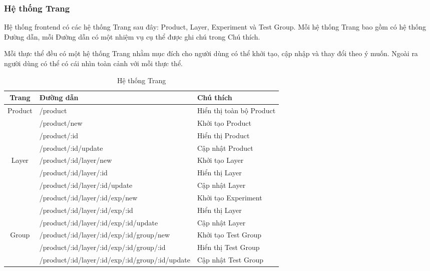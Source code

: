 \subsubsection{Hệ thống Trang}

Hệ thống frontend có các hệ thống Trang sau đây: Product, Layer, Experiment và Test Group. Mỗi hệ thống Trang bao gồm có hệ thống Đường dẫn, mỗi Đường dẫn có một nhiệm vụ cụ thể được ghi chú trong Chú thích.

Mỗi thực thể đều có một hệ thống Trang nhằm mục đích cho người dùng có thể khởi tạo, cập nhập và thay đổi theo ý muốn. Ngoài ra người dùng có thể có cái nhìn toàn cảnh với mỗi thực thể.

\begin{table}[H]
	\centering
	\begin{tabular}{|c|l|p{5cm}|}
		\hline
		Trang                    & Đường dẫn                                       & Chú thích                \\ \hline
		\multirow{4}{*}{Product} & /product                                        & Hiển thị toàn bộ Product \\ \cline{2-3}
		                         & /product/new                                    & Khởi tạo Product         \\ \cline{2-3}
		                         & /product/:id                                    & Hiển thị Product         \\ \cline{2-3}
		                         & /product/:id/update                             & Cập nhật Product         \\ \hline
		\multirow{4}{*}{Layer}
		                         & /product/:id/layer/new                          & Khởi tạo Layer           \\ \cline{2-3}
		                         & /product/:id/layer/:id                          & Hiển thị Layer           \\ \cline{2-3}
		                         & /product/:id/layer/:id/update                   & Cập nhật Layer           \\ \hline
		\multirow{4}{*}{Experiment}
		                         & /product/:id/layer/:id/exp/new                  & Khởi tạo Experiment      \\ \cline{2-3}
		                         & /product/:id/layer/:id/exp/:id                  & Hiển thị Layer           \\ \cline{2-3}
		                         & /product/:id/layer/:id/exp/:id/update           & Cập nhật Layer           \\ \hline
		\multirow{4}{*}{Group}
		                         & /product/:id/layer/:id/exp/:id/group/new        & Khởi tạo Test Group      \\ \cline{2-3}
		                         & /product/:id/layer/:id/exp/:id/group/:id        & Hiển thị Test Group      \\ \cline{2-3}
		                         & /product/:id/layer/:id/exp/:id/group/:id/update & Cập nhật Test Group      \\ \hline
	\end{tabular}
	\caption{Hệ thống Trang}
\end{table}

